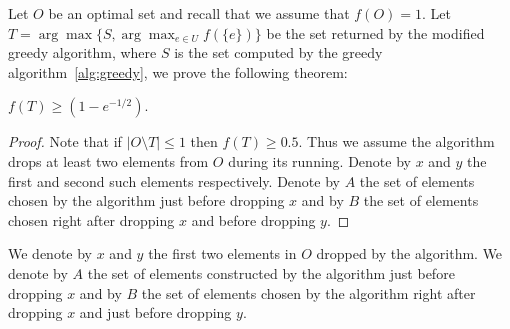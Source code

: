 Let $O$ be an optimal set and recall that we assume that $f(O) = 1$.
Let $T = \arg\max\{S, \displaystyle{\arg\max_{e \in U}}f(\{e\})\}$ 
be the set returned by the modified greedy algorithm, 
where $S$ is the set computed by the greedy algorithm~\ref{alg:greedy},
we prove the following theorem:

\begin{theorem}
$f(T) \geq (1 - e^{-1/2})$.
\end{theorem}

\begin{proof}
Note that if $|O \setminus T| \leq 1$ then $f(T) \geq 0.5$. 
Thus we assume the algorithm drops at least two elements from $O$ during its running. 
Denote by $x$ and $y$ the first and second such elements respectively.
Denote by $A$ the set of elements chosen by the algorithm just before dropping $x$ and by
$B$ the set of elements chosen right after dropping $x$ and before dropping $y$. 
\end{proof}


We denote by $x$ and $y$ the first two elements in $O$ dropped by the algorithm.  
We denote by $A$ the set of elements constructed by the algorithm just before
dropping $x$ and by $B$ the set of elements chosen by the algorithm right after dropping $x$ 
and just before dropping $y$.

\begin{figure}[h]
\end{figure}

